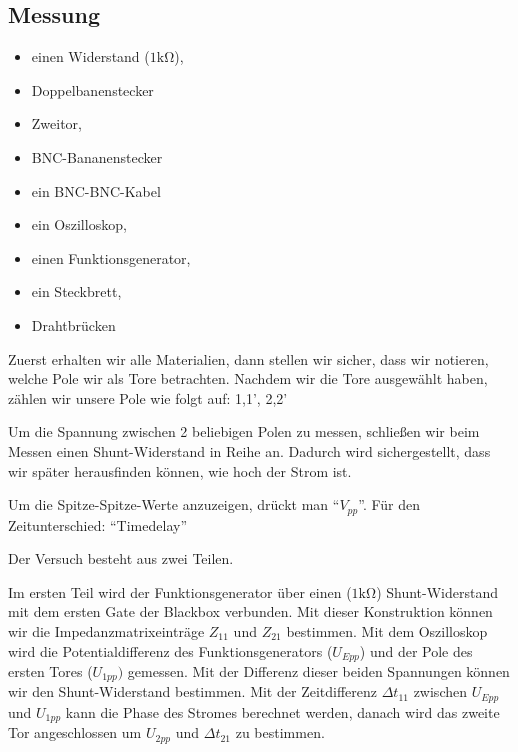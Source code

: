 %
\subsection{Messung}
\label{subsec:3_Messung}
%
%
\begin{itemize}
    \item einen Widerstand ($1\si{\kilo\ohm}$), 
    \item Doppelbanenstecker
    \item Zweitor,
    \item BNC-Bananenstecker
    \item ein BNC-BNC-Kabel 
    \item ein Oszilloskop, 
    \item einen Funktionsgenerator, 
    \item ein Steckbrett,
    \item Drahtbrücken
\end{itemize}

Zuerst erhalten wir alle Materialien, dann stellen wir sicher, dass wir notieren, welche Pole wir als Tore betrachten. Nachdem wir die Tore ausgewählt haben, zählen wir unsere Pole wie folgt auf: 1,1', 2,2'

Um die Spannung zwischen 2 beliebigen Polen zu messen, schließen wir beim Messen einen Shunt-Widerstand in Reihe an. Dadurch wird sichergestellt, dass wir später herausfinden können, wie hoch der Strom ist.

Um die Spitze-Spitze-Werte anzuzeigen, drückt man  \enquote{$V_{pp}$}. Für den Zeitunterschied: \enquote{Timedelay}

Der Versuch besteht aus zwei Teilen.
\par Im ersten Teil wird der Funktionsgenerator über einen  ($1\si{\kilo\ohm}$) Shunt-Widerstand mit dem ersten Gate der Blackbox verbunden. Mit dieser Konstruktion können wir die Impedanzmatrixeinträge $Z_{11}$ und $Z_{21}$ bestimmen. Mit dem Oszilloskop wird die Potentialdifferenz des Funktionsgenerators ($U_{Epp}$) und der Pole des ersten Tores ($U_{1pp})$ gemessen. Mit der Differenz dieser beiden Spannungen können wir den Shunt-Widerstand bestimmen. Mit der Zeitdifferenz $\Delta t_{11}$ zwischen $U_{Epp}$ und $U_{1pp}$ kann die Phase des Stromes berechnet werden, danach wird das zweite Tor angeschlossen um $U_{2pp}$ und $\Delta t_{21}$ zu bestimmen.

